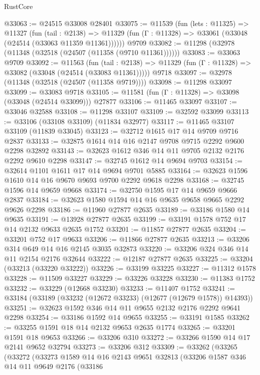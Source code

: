 \begin{lexlean}{RustCore}
\begin{coremodule}
@33063 := @24515 @33008 @28401
@33075 := @11539
    (fun (lets : @11325) =>
    @11327
      (fun (tail : @2138) =>
      @11329 (fun (Γ : @11328) => @33061 (@33048 (@24514 (@33063 @11359 @11361))))))
    @9709
@33082 := @11298 (@32978 (@11348 (@32518 (@24507 (@11358 (@9710 @11361))))))
@33083 := @33063 @9709
@33092 := @11563
    (fun (tail : @2138) => @11329 (fun (Γ : @11328) => @33082 (@33048 (@24514 (@33083 @11361)))))
    @9718
@33097 := @32978 (@11348 (@32518 (@24507 (@11358 @9719))))
@33098 := @11298 @33097
@33099 := @33083 @9718
@33105 := @11581 (fun (Γ : @11328) => @33098 (@33048 (@24514 @33099))) @27877
@33106 := @11465 @33097
@33107 := @33046 @32588
@33108 := @11298 @33107
@33109 := @32592 @33099
@33113 := @33106 (@33108 @33109) (@11834 @32977)
@33117 := @11465 @33107 @33109 (@11839 @33045)
@33123 := @32712 @1615 @17 @14 @9709 @9716 @2837
@33133 := @32875 @1614 @14 @16 @2147 @9708 @9715 @2292 @9600 @2298 @32892
@33143 := @32623 @1612 @346 @14 @11 @9705 @2132 @2176 @2292 @9610 @2298
@33147 := @32745 @1612 @14 @9694 @9703
@33154 := @32614 @1101 @1611 @17 @14 @9694 @9701 @5885
@33164 := @32623 @1596 @1610 @14 @16 @9670 @9693 @9700 @2292 @9618 @2298
@33168 := @32745 @1596 @14 @9659 @9668
@33174 := @32750 @1595 @17 @14 @9659 @9666 @2837
@33184 := @32623 @1580 @1594 @14 @16 @9635 @9658 @9665 @2292 @9626 @2298
@33186 := @11960 @27877 @2635
@33189 := @33186 @1580 @14 @9635
@33191 := @13928 @27877 @2635
@33199 := @33191 @1578 @752 @17 @14 @2132 @9633 @2635 @1752
@33201 := @11857 @27877 @2635
@33204 := @33201 @752 @17 @9633
@33206 := @11866 @27877 @2635
@33213 := @33206 @314 @649 @14 @16 @2145 @3035 @32873
@33220 := @33206 @324 @346 @14 @11 @2154 @2176 @32644
@33222 := @12187 @27877 @2635
@33225 := @33204 (@33213 (@33220 @33222))
@33226 := @33199 @33225
@33227 := @11312 @1578
@33228 := @11509 @33227
@33229 := @33226 @33228
@33230 := @11383 @1752
@33232 := @33229 (@12668 @33230)
@33233 := @11407 @1752
@33241 := @33184 (@33189 (@33232 (@12672 @33233) (@12677 (@12679 @1578)) @14393))
@33251 := @32623 @1592 @346 @14 @11 @9655 @2132 @2176 @2292 @9641 @2298
@33254 := @33186 @1592 @14 @9655
@33255 := @33191 @1585
@33262 := @33255 @1591 @18 @14 @2132 @9653 @2635 @1774
@33265 := @33201 @1591 @18 @9653
@33266 := @33206 @310
@33272 := @33266 @1590 @14 @17 @2141 @9652 @32794
@33273 := @33206 @312
@33309 := @33262
    (@33265
      (@33272
        (@33273
          @1589
          @14
          @16
          @2143
          @9651
          @32813
          (@33206
            @1587
            @346
            @14
            @11
            @9649
            @2176
            (@33186

\end{coremodule}
\end{lexlean}
